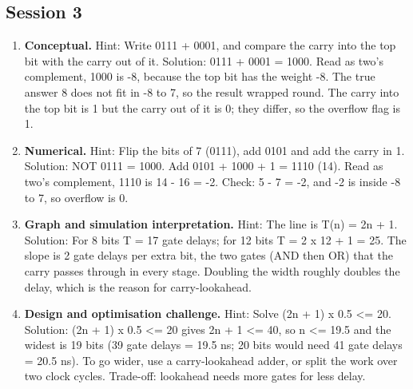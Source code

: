 \documentclass[11pt,a4paper]{article}
\begin{document}
\subsection*{Session 3}
\begin{enumerate}[nosep]
\item \textbf{Conceptual.} Hint: Write 0111 + 0001, and compare the carry into the top bit with the carry out of it. Solution: 0111 + 0001 = 1000. Read as two's complement, 1000 is -8, because the top bit has the weight -8. The true answer 8 does not fit in -8 to 7, so the result wrapped round. The carry into the top bit is 1 but the carry out of it is 0; they differ, so the overflow flag is 1.
\item \textbf{Numerical.} Hint: Flip the bits of 7 (0111), add 0101 and add the carry in 1. Solution: NOT 0111 = 1000. Add 0101 + 1000 + 1 = 1110 (14). Read as two's complement, 1110 is 14 - 16 = -2. Check: 5 - 7 = -2, and -2 is inside -8 to 7, so overflow is 0.
\item \textbf{Graph and simulation interpretation.} Hint: The line is T(n) = 2n + 1. Solution: For 8 bits T = 17 gate delays; for 12 bits T = 2 x 12 + 1 = 25. The slope is 2 gate delays per extra bit, the two gates (AND then OR) that the carry passes through in every stage. Doubling the width roughly doubles the delay, which is the reason for carry-lookahead.
\item \textbf{Design and optimisation challenge.} Hint: Solve (2n + 1) x 0.5 \textless{}= 20. Solution: (2n + 1) x 0.5 \textless{}= 20 gives 2n + 1 \textless{}= 40, so n \textless{}= 19.5 and the widest is 19 bits (39 gate delays = 19.5 ns; 20 bits would need 41 gate delays = 20.5 ns). To go wider, use a carry-lookahead adder, or split the work over two clock cycles. Trade-off: lookahead needs more gates for less delay.
\end{enumerate}
\end{document}
